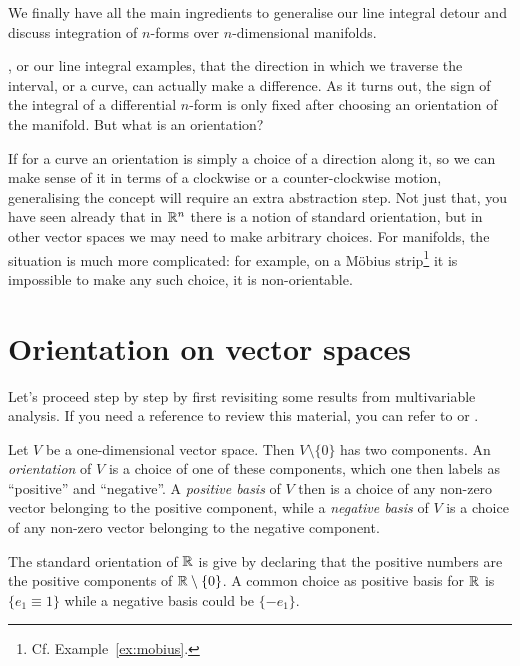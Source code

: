 We finally have all the main ingredients to generalise our line integral detour and discuss integration of $n$-forms over $n$-dimensional manifolds.

, or our line integral examples, that the direction in which we traverse the interval, or a curve, can actually make a difference.
As it turns out, the sign of the integral of a differential $n$-form is only fixed after choosing an orientation of the manifold.
But what is an orientation?

If for a curve an orientation is simply a choice of a direction along it, so we can make sense of it in terms of a clockwise or a counter-clockwise motion, generalising the concept will require an extra abstraction step.
Not just that, you have seen already that in $\mathbb{R}^n$ there is a notion of standard orientation, but in other vector spaces we may need to make arbitrary choices.
For manifolds, the situation is much more complicated: for example, on a M\"obius strip\footnote{Cf. Example~\ref{ex:mobius}.} it is impossible to make any such choice, it is non-orientable.

\section{Orientation on vector spaces}
Let's proceed step by step by first revisiting some results from multivariable analysis. If you need a reference to review this material, you can refer to \cite[Chapter 6.2]{book:abrahammarsdenratiu} or \cite[Chapters 21.1-21.2]{book:tu}.

\begin{definition}
  Let $V$ be a one-dimensional vector space. Then $V\setminus\{0\}$ has two components.
  An \emph{orientation} of $V$ is a choice of one of these components, which one then labels as ``positive'' and ``negative''.
  A \emph{positive basis} of $V$ then is a choice of any non-zero vector belonging to the positive component, while a \emph{negative basis} of $V$ is a choice of any non-zero vector belonging to the negative component.
\end{definition}

\begin{example}
  The standard orientation of $\mathbb{R}$ is give by declaring that the positive numbers are the positive components of $\mathbb{R}\setminus\{0\}$.
  A common choice as positive basis for $\mathbb{R}$ is $\{e_1 \equiv 1\}$ while a negative basis could be $\{-e_1\}$.
\end{example}

